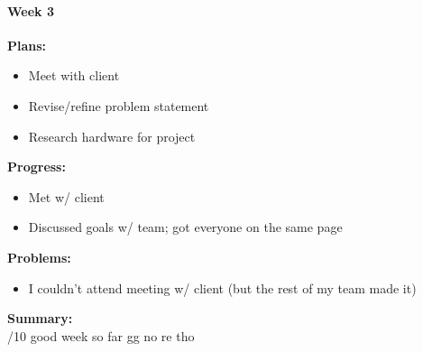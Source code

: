 \paragraph{Week 3}
\begin{adjustwidth}{2.5em}{0pt}
    \vspace{-0.5cm}\textbf{Plans:}
    \vspace{-0.5cm}
    \begin{itemize}
        \item Meet with client
        \item Revise/refine problem statement
        \item Research hardware for project
    \end{itemize} 
    \vspace{-0.3cm}\textbf{Progress:}
    \vspace{-0.5cm}
    \begin{itemize}
        \item Met w/ client
        \item Discussed goals w/ team; got everyone on the same page
    \end{itemize} 
    \vspace{-0.3cm}\textbf{Problems:}
    \vspace{-0.5cm}
    \begin{itemize}
        \item I couldn't attend meeting w/ client (but the rest of my team made it)
    \end{itemize}  
    \vspace{-0.3cm}\noindent\textbf{Summary:}\\
    /10 good week so far gg no re tho
\end{adjustwidth} 

